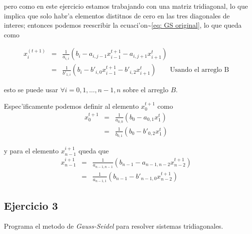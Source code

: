 \documentclass[11pt]{article}
\begin{document}
\noindent pero como en este ejercicio estamos trabajando con una matriz
tridiagonal, lo que implica que solo habr'a elementos distitnos de cero
en las tres diagonales de interes; entonces podemos reescribir la
ecuaci'on\textasciitilde{}\ref{eq: GS original}, lo que queda como

\begin{eqnarray*}
    x_{i}^{(t+1)} &=& \frac{1}{a_{i,i}}\left( b_i - a_{i, j-1}x_{i-1}^{t+1} - a_{i, j+1}x_{i+1}^{t}\right)
    \label{eq: GS tridiagonal} \\
     &=& \frac{1}{b'_{1,i}}\left( b_i - b'_{i,0}x_{i-1}^{t+1} - b'_{i,2}x_{i+1}^{t}\right)
    \qquad\text{Usando el arreglo B} \label{eq: GS tridiagonal con B}
\end{eqnarray*}

\noindent esto se puede usar \(\forall i = 0,1,\dots,n-1,n\) sobre el
arreglo \(B\).

\par

Espec'ificamente podemos definir al elemento \(x_0^{t+1}\) como
\begin{eqnarray*}
    x_0^{t+1} &=& \frac{1}{a_{0,0}} \left( b_0 - a_{0, 1}x_1^{t}  \right) \\
        &=& \frac{1}{b_{0,1}} \left( b_0 - b'_{0, 2}x_1^{t}  \right)
\end{eqnarray*}

\noindent y para el elemento \(x_{n-1}^{i+1}\) queda que
\begin{eqnarray*}
    x_{n-1}^{i+1} &=& \frac{1}{a_{n-1,n-1}} \left( b_{n-1} - a_{n-1, n-2}x_{n-2}^{t+1}  \right) \\
        &=& \frac{1}{a_{n-1,1}} \left( b_{n-1} - b'_{n-1, 0}x_{n-2}^{t+1}  \right)
\end{eqnarray*}




















\newpage
    \hypertarget{ejercicio-3}{%
\subsection{Ejercicio 3}\label{ejercicio-3}}

    Programa el metodo de \textit{Gauss-Seidel} para resolver sistemas
tridiagonales.
\end{document}

